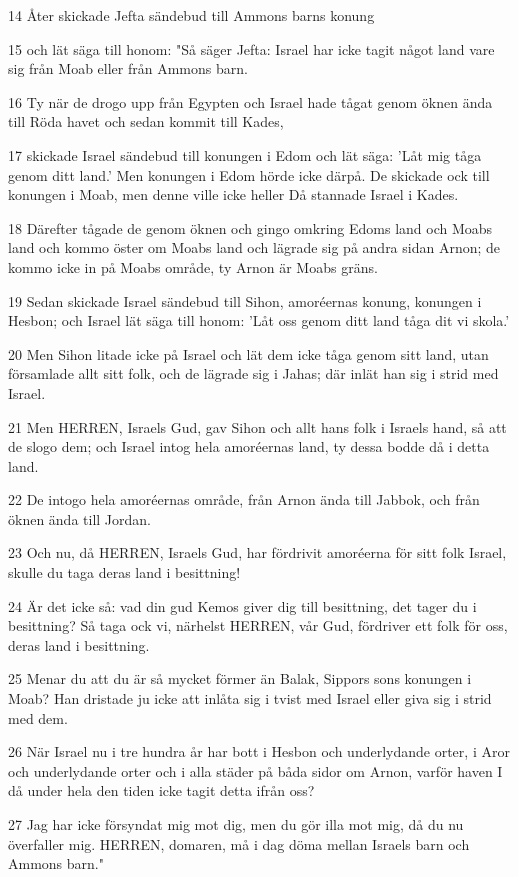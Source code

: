 \par 14 Åter skickade Jefta sändebud till Ammons barns konung
\par 15 och lät säga till honom: "Så säger Jefta: Israel har icke tagit något land vare sig från Moab eller från Ammons barn.
\par 16 Ty när de drogo upp från Egypten och Israel hade tågat genom öknen ända till Röda havet och sedan kommit till Kades,
\par 17 skickade Israel sändebud till konungen i Edom och lät säga: 'Låt mig tåga genom ditt land.' Men konungen i Edom hörde icke därpå. De skickade ock till konungen i Moab, men denne ville icke heller Då stannade Israel i Kades.
\par 18 Därefter tågade de genom öknen och gingo omkring Edoms land och Moabs land och kommo öster om Moabs land och lägrade sig på andra sidan Arnon; de kommo icke in på Moabs område, ty Arnon är Moabs gräns.
\par 19 Sedan skickade Israel sändebud till Sihon, amoréernas konung, konungen i Hesbon; och Israel lät säga till honom: 'Låt oss genom ditt land tåga dit vi skola.'
\par 20 Men Sihon litade icke på Israel och lät dem icke tåga genom sitt land, utan församlade allt sitt folk, och de lägrade sig i Jahas; där inlät han sig i strid med Israel.
\par 21 Men HERREN, Israels Gud, gav Sihon och allt hans folk i Israels hand, så att de slogo dem; och Israel intog hela amoréernas land, ty dessa bodde då i detta land.
\par 22 De intogo hela amoréernas område, från Arnon ända till Jabbok, och från öknen ända till Jordan.
\par 23 Och nu, då HERREN, Israels Gud, har fördrivit amoréerna för sitt folk Israel, skulle du taga deras land i besittning!
\par 24 Är det icke så: vad din gud Kemos giver dig till besittning, det tager du i besittning? Så taga ock vi, närhelst HERREN, vår Gud, fördriver ett folk för oss, deras land i besittning.
\par 25 Menar du att du är så mycket förmer än Balak, Sippors sons konungen i Moab? Han dristade ju icke att inlåta sig i tvist med Israel eller giva sig i strid med dem.
\par 26 När Israel nu i tre hundra år har bott i Hesbon och underlydande orter, i Aror och underlydande orter och i alla städer på båda sidor om Arnon, varför haven I då under hela den tiden icke tagit detta ifrån oss?
\par 27 Jag har icke försyndat mig mot dig, men du gör illa mot mig, då du nu överfaller mig. HERREN, domaren, må i dag döma mellan Israels barn och Ammons barn."
